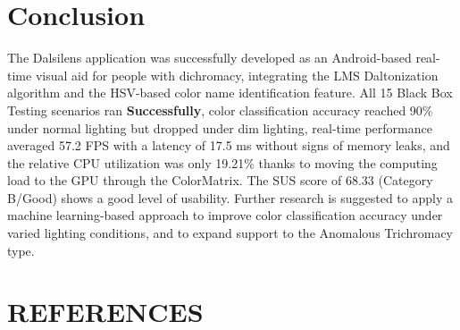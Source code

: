 \section{Conclusion}

The Dalsilens application was successfully developed as an Android-based real-time visual aid for people with dichromacy, integrating the LMS Daltonization algorithm and the HSV-based color name identification feature. All 15 Black Box Testing scenarios ran \textbf{Successfully}, color classification accuracy reached 90\% under normal lighting but dropped under dim lighting, real-time performance averaged 57.2 FPS with a latency of 17.5 ms without signs of memory leaks, and the relative CPU utilization was only 19.21\% thanks to moving the computing load to the GPU through the ColorMatrix. The SUS score of 68.33 (Category B/Good) shows a good level of usability. Further research is suggested to apply a machine learning-based approach to improve color classification accuracy under varied lighting conditions, and to expand support to the Anomalous Trichromacy type.

\section*{\fontsize{11}{13}\selectfont\bfseries REFERENCES}


